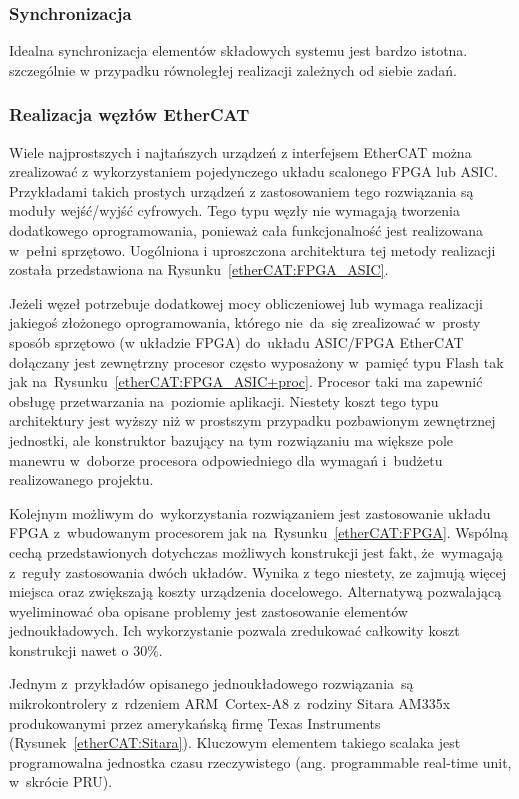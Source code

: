 \subsubsection{Synchronizacja}
Idealna synchronizacja elementów składowych systemu jest bardzo istotna. szczególnie w przypadku równoległej realizacji zależnych od siebie zadań.

\subsubsection{Realizacja węzłów EtherCAT}
Wiele najprostszych i najtańszych urządzeń z interfejsem EtherCAT można zrealizować z wykorzystaniem pojedynczego układu scalonego FPGA lub ASIC. Przykładami takich prostych urządzeń z zastosowaniem tego rozwiązania są moduły wejść/wyjść cyfrowych. Tego typu węzły nie wymagają tworzenia dodatkowego oprogramowania, ponieważ cała funkcjonalność jest realizowana w~pełni sprzętowo. Uogólniona i uproszczona architektura tej metody realizacji została przedstawiona na Rysunku~\ref{etherCAT:FPGA_ASIC}.

Jeżeli węzeł potrzebuje dodatkowej mocy obliczeniowej lub wymaga realizacji jakiegoś złożonego oprogramowania, którego nie~da~się zrealizować w~prosty sposób sprzętowo (w układzie FPGA) do~układu ASIC/FPGA EtherCAT dołączany jest zewnętrzny procesor często wyposażony w~pamięć typu Flash tak jak na~Rysunku~\ref{etherCAT:FPGA_ASIC+proc}. Procesor taki ma zapewnić obsługę przetwarzania na~poziomie aplikacji. Niestety koszt tego typu architektury jest wyższy niż w prostszym przypadku pozbawionym zewnętrznej jednostki, ale konstruktor bazujący na tym rozwiązaniu ma większe pole manewru w~doborze procesora odpowiedniego dla wymagań i~budżetu realizowanego projektu.

Kolejnym możliwym do~wykorzystania rozwiązaniem jest zastosowanie układu FPGA z~wbudowanym procesorem jak na~Rysunku~\ref{etherCAT:FPGA}. Wspólną cechą przedstawionych dotychczas możliwych konstrukcji jest fakt, że~wymagają z~reguły zastosowania dwóch układów. Wynika z tego niestety, ze zajmują więcej miejsca oraz zwiększają koszty urządzenia docelowego. Alternatywą pozwalającą wyeliminować oba opisane problemy jest zastosowanie elementów jednoukładowych. Ich wykorzystanie pozwala zredukować całkowity koszt konstrukcji nawet o 30\%.

Jednym z~przykładów opisanego jednoukładowego rozwiązania~są mikrokontrolery z~rdzeniem ARM~Cortex-A8 z~rodziny Sitara AM335x produkowanymi przez amerykańską firmę Texas Instruments (Rysunek~\ref{etherCAT:Sitara}). Kluczowym elementem takiego scalaka jest programowalna jednostka czasu rzeczywistego (ang. programmable real-time unit, w~skrócie PRU). 

